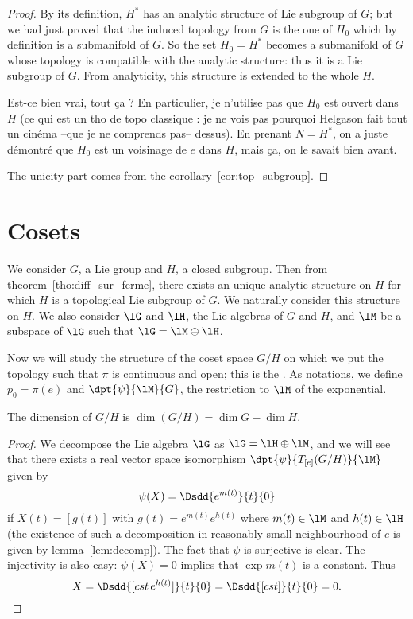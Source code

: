 \begin{proof}
By its definition, $H^*$ has an analytic structure of Lie subgroup of $G$; but we had just proved that the induced topology from $G$ is the one of $H_0$ which by definition is a submanifold of $G$. So the set $H_0=H^*$ becomes a submanifold of $G$ whose topology is compatible with the analytic structure: thus it is a Lie subgroup of $G$. From analyticity, this structure is extended to the whole $H$.

\begin{probleme}
Est-ce bien vrai, tout \c ca ? En particulier, je n'utilise pas que $H_0$ est ouvert dans $H$ (ce qui est un tho de topo classique : je ne vois pas pourquoi Helgason fait tout un cin\'ema --que je ne comprends pas-- dessus). En prenant $N=H^*$, on a juste d\'emontr\'e que $H_0$ est un voisinage de $e$ dans $H$, mais ça, on le savait bien avant.
\end{probleme}

The unicity part comes from the corollary~\ref{cor:top_subgroup}.
\end{proof}

\section{Cosets}

We consider $G$, a Lie group and $H$, a closed subgroup. Then from theorem~\ref{tho:diff_sur_ferme},  there exists an unique analytic structure on $H$ for which $H$ is a topological Lie subgroup of $G$. We naturally consider this structure on $H$. We also consider $\lG$ and $\lH$, the Lie algebras of $G$ and $H$, and $\lM$ be a subspace of $\lG$ such that $\lG=\lM\oplus\lH$.

Now we will study the structure of the coset space $G/H$ on which we put the topology such that $\pi$ is continuous and open; this is the \label{pg:natur_topo}. As notations, we define $p_0=\pi(e)$ and $\dpt{\psi}{\lM}{G}$, the restriction to $\lM$ of the exponential.

\begin{lemma}
The dimension of $G/H$ is $\dim (G/H)=\dim G-\dim H$.
 \label{lem:dim_G_H}
\end{lemma}

\begin{proof}
We decompose the Lie algebra $\lG$ as $\lG=\lH\oplus\lM$, and we will see that there exists a real vector space isomorphism $\dpt{\psi}{T_{[e]}(G/H)}{\lM}$ given by
\begin{equation}
   \psi(X)=\Dsdd{ e^{m(t)} }{t}{0}
\end{equation}
if $X(t)=[g(t)]$ with $g(t)=e^{m(t)}e^{h(t)}$ where $m(t)\in\lM$ and $h(t)\in\lH$ (the existence of such a decomposition in reasonably small neighbourhood of $e$ is given by lemma~\ref{lem:decomp}). The fact that $\psi$ is surjective is clear. The injectivity is also easy: $\psi(X)=0$ implies that $\exp m(t)$ is a constant. Thus
\[
X=\Dsdd{ [cst\, e^{h(t)}] }{t}{0}=\Dsdd{[cst]}{t}{0}=0.
\]

\end{proof}

